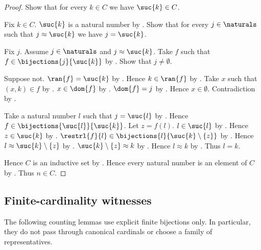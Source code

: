 \begin{proof}
    Show that for every $k\in C$ we have $\suc{k}\in C$.
    \begin{subproof}
        Fix $k\in C$.
        $\suc{k}$ is a natural number by .
        Show that for every $j\in\naturals$ such that
            $j\approx\suc{k}$ we have $j=\suc{k}$.
        \begin{subproof}
            Fix $j$.
            Assume $j\in\naturals$ and $j\approx\suc{k}$.
            Take $f$ such that $f\in\bijections{j}{\suc{k}}$
                by .
            Show that $j\neq\emptyset$.
            \begin{subproof}
                Suppose not.
                $\ran{f}=\suc{k}$ by .
                Hence $k\in\ran{f}$ by .
                Take $x$ such that $(x,k)\in f$ by .
                $x\in\dom{f}$ by .
                $\dom{f}=j$ by .
                Hence $x\in\emptyset$.
                Contradiction by .
            \end{subproof}
            Take a natural number $l$ such that $j=\suc{l}$
                by .
            Hence $f\in\bijections{\suc{l}}{\suc{k}}$.
            Let $z=f(l)$.
            $l\in\suc{l}$ by .
            Hence $z\in\suc{k}$
                by .
            $\restrl{f}{l}\in
                \bijections{l}{\suc{k}\setminus\{z\}}$
                by .
            Hence $l\approx\suc{k}\setminus\{z\}$ by .
            $\suc{k}\setminus\{z\}\approx k$
                by .
            Hence $l\approx k$ by .
            Thus $l=k$.
        \end{subproof}
    \end{subproof}

    Hence $C$ is an inductive set by .
    Hence every natural number is an element of $C$
        by .
    Thus $n\in C$.
\end{proof}

\subsection{Finite-cardinality witnesses}

The following counting lemmas use explicit finite bijections only.  In
particular, they do not pass through canonical cardinals or choose a family of
representatives.

